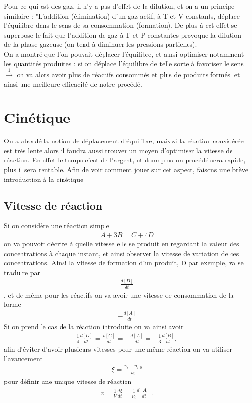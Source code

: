 \documentclass[12pt,prb,aps,epsf]{report}
\begin{document}
Pour ce qui est des gaz, il n'y a pas d'effet de la dilution, et on a un principe similaire : "L'addition (élimination) d'un gaz actif, à T et V constants, déplace l'équilibre dans le sens de sa consommation (formation). De plus à cet effet se superpose le fait que l'addition de gaz à T et P constantes provoque la dilution de la phase gazeuse (on tend à diminuer les pressions partielles).\\

 On a montré que l'on pouvait déplacer l'équilibre, et ainsi optimiser notamment les quantités produites : si on déplace l'équilibre de telle sorte à favoriser le sens $\stackrel{1}\longrightarrow$ on va alors avoir plus de réactifs consommés et plus de produits formés, et ainsi une meilleure efficacité de notre procédé.
\section{Cinétique}
On a abordé la notion de déplacement d'équilibre, mais si la réaction considérée est très lente alors il faudra aussi trouver un moyen d'optimiser la vitesse de réaction. En effet le temps c'est de l'argent, et donc plus un procédé sera rapide, plus il sera rentable. Afin de voir comment jouer sur cet aspect, faisons une brève introduction à la cinétique.

\subsection{Vitesse de réaction}
Si on considère une réaction simple 
\begin{eqnarray}
A + 3B = C + 4D
\end{eqnarray}
on va pouvoir décrire à quelle vitesse elle se produit en regardant la valeur des concentrations à chaque instant, et ainsi observer la vitesse de variation de ces concentrations. Ainsi la vitesse de formation d'un produit, D par exemple, va se traduire par 
\begin{eqnarray}
\frac{d[D]}{dt}
\end{eqnarray}
, et de même pour les réactifs on va avoir une vitesse de consommation de la forme
\begin{eqnarray}
-\frac{d[A]}{dt}
\end{eqnarray}
Si on prend le cas de la réaction introduite on va ainsi avoir
\begin{eqnarray}
\frac{1}{4}\frac{d[D]}{dt} = \frac{d[C]}{dt} = -\frac{d[A]}{dt} = -\frac{1}{3}\frac{d[B]}{dt},
\end{eqnarray}
afin d'éviter d'avoir plusieurs vitesses pour une même réaction on va utiliser l'avancement 
\begin{eqnarray}
\xi = \frac{n_i-n_{i,0}}{\nu_i}
\end{eqnarray}
pour définir une unique vitesse de réaction 
\begin{eqnarray}
v = \frac{1}{V}\frac{d\xi}{dt} = \frac{1}{\nu_i}\frac{d[A_i]}{dt}.
\end{eqnarray}
\end{document}
